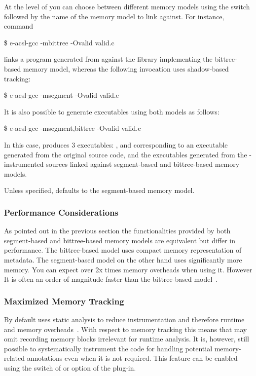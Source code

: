 At the level of \eacslgcc you can choose between different memory models using
the  switch followed by the name of the memory model to link
against.  For instance, command
\begin{logs}
\$ e-acsl-gcc -mbittree -Ovalid valid.c
\end{logs}
links a program generated from  against the library implementing the
bittree-based memory model, whereas the following invocation uses shadow-based
tracking:
\begin{logs}
\$ e-acsl-gcc -msegment -Ovalid valid.c
\end{logs}
It is also possible to generate executables using both models as follows:
\begin{logs}
\$ e-acsl-gcc -msegment,bittree -Ovalid valid.c
\end{logs}
In this case, \eacslgcc produces 3 executables: ,
 and  corresponding to an
executable generated from the original source code, and the executables
generated from the \eacsl-instrumented sources linked against
segment-based and bittree-based memory models.

Unless specified, \eacsl defaults to the segment-based memory model.

\subsubsection{Performance Considerations}
\label{sec:perf}

As pointed out in the previous section the functionalities provided by both
segment-based and bittree-based memory models are equivalent but differ in
performance. The bittree-based model uses compact memory representation of
metadata. The segment-based model on the other hand uses significantly more
memory. You can expect over 2x times memory overheads when using it. However It
is often an order of magnitude faster than the bittree-based
model~\cite{vorobyov17ismm}.


\subsubsection{Maximized Memory Tracking}

By default \eacsl uses static analysis to reduce instrumentation and therefore
runtime and memory overheads~\cite{ly18hilt}. With respect to memory tracking
this means that
\eacsl may omit recording memory blocks irrelevant for runtime analysis.  It
is, however, still possible to systematically instrument the code for handling
potential memory-related annotations even when it is not required.  This
feature can be enabled using the  switch of \eacslgcc or
 option of the \eacsl plug-in.

